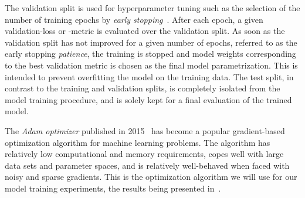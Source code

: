 The validation split is used for hyperparameter tuning such as the selection of the number of training epochs by \textit{early stopping}~\cite{early-stopping}.
After each epoch, a given validation-loss or -metric is evaluated over the validation split.
As soon as the validation split has not improved for a given number of epochs, referred to as the early stopping \textit{patience}, the training is stopped and model weights corresponding to the best validation metric is chosen as the final model parametrization.
This is intended to prevent overfitting the model on the training data.
The test split, in contrast to the training and validation splits, is completely isolated from the model training procedure, and is solely kept for a final evaluation of the trained model.

The \textit{Adam optimizer} published in 2015~\cite{adam-optimizer} has become a popular gradient-based optimization algorithm for machine learning problems.
The algorithm has relatively low computational and memory requirements, copes well with large data sets and parameter spaces, and is relatively well-behaved when faced with noisy and sparse gradients.
This is the optimization algorithm we will use for our model training experiments, the results being presented in~.

